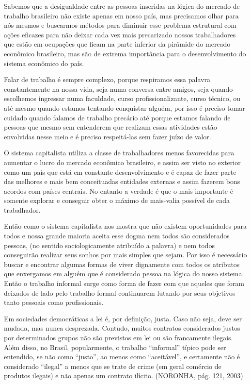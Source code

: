 Sabemos que a desigualdade entre as pessoas inseridas na lógica do mercado de trabalho brasileiro não existe apenas em nosso país, mas precisamos olhar para nós mesmos e buscarmos métodos para diminuir esse problema estrutural com ações eficazes para não deixar cada vez mais precarizado nossos trabalhadores que estão em ocupações que ficam na parte inferior da pirâmide do mercado econômico brasileiro, mas são de extrema importância para o desenvolvimento do sistema econômico do país.

Falar de trabalho é sempre complexo, porque respiramos essa palavra constantemente na nossa vida, seja numa conversa entre amigos, seja quando escolhemos ingressar numa faculdade, curso profissionalizante, curso técnico, ou até mesmo quando estamos tentando conquistar alguém, por isso é preciso tomar cuidado quando falamos de trabalho precário até porque estamos falando de pessoas que mesmo sem entenderem que realizam essas atividades estão envolvidas nesse meio e é preciso respeitá-las sem fazer juízo de valor.
 
O sistema capitalista utiliza a classe de trabalhadores menos favorecidas para aumentar o lucro do mercado econômico brasileiro, e assim ser visto no exterior como um país que está em constante desenvolvimento e é capaz de fazer parte das melhores e mais bem conceituadas entidades externas e assim fazerem bons acordos com países centrais. No entanto a verdade é que o mais importante é somente explorar e conseguir obter o máximo de mais-valia possível de cada trabalhador.

Então como o sistema capitalista nos mostra que não existem oportunidades para todos e nossa grande maioria aceita esse dogma nem todos são considerados pessoas, (no sentido sociologicamente atribuído a palavra) e nem todos conseguirão realizar seus sonhos por mais simples que sejam. Por isso é necessário buscar e encontrar algumas formas de viver dignamente com  todos os atributos que enxergamos em alguém que é considerado pessoa na lógica do nosso sistema. Então o trabalho informal surge como forma de fazer com que aqueles que foram deixados de lado pelo trabalho formal continuarem lutando por seus objetivos tanto pessoais como profissionais.

\begin{citacao}
Em sociedades democráticas a lei é, por definição, justa. Caso não seja, deve ser mudada, mas nunca desprezada. Contudo, muitos contratos considerados justos por determinados grupos não são previstos em lei ou são francamente ilegais. Além disso, no Brasil, popularmente, o trabalho ``informal'' típico pode ser entendido, se não como ``justo'', ao menos como ``aceitável'', e certamente não é considerado ``ilegal'' a menos que se trate de crime (em geral comércio de produtos ilegais) e não apenas um contrato ilícito. (NORONHA, pág. 121, 2003)
\end{citacao}

